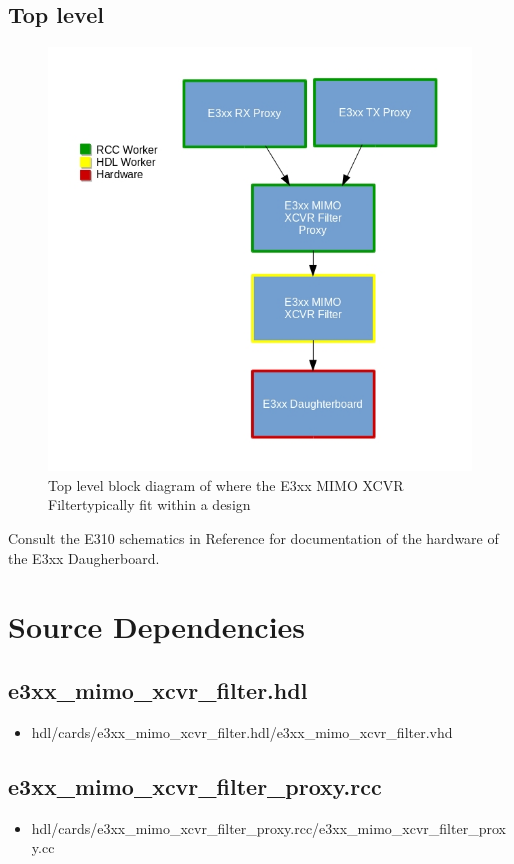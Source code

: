 \documentclass{article}
\def\comp{e3xx\_mimo\_xcvr\_filter}
\def\proxy{e3xx\_mimo\_xcvr\_filter\_proxy}
\def\Comp{E3xx MIMO XCVR Filter and Proxy }
\def\comp{e3xx\_mimo\_xcvr\_filter}
\def\Comp{E3xx MIMO XCVR Filter}
\begin{document}
\subsection*{Top level}
\begin{figure}[ht]
	\centerline{\includegraphics[scale=0.75]{e3xx_mimo_filter_top_level_diagram}}
	\caption{Top level block diagram of where the \Comp typically fit within a design}
	\label{fig:tb}
\end{figure}
\flushleft
Consult the E310 schematics in Reference \cite{schematics} for documentation of the hardware of the E3xx Daugherboard.
\section*{Source Dependencies}
\subsection*{\comp.hdl}
\begin{itemize}
	\item hdl/cards/\comp.hdl/\comp.vhd
\end{itemize}
\subsection*{\proxy.rcc}
\begin{itemize}
	\item hdl/cards/\proxy.rcc/\proxy.cc
\end{itemize}
\end{document}
